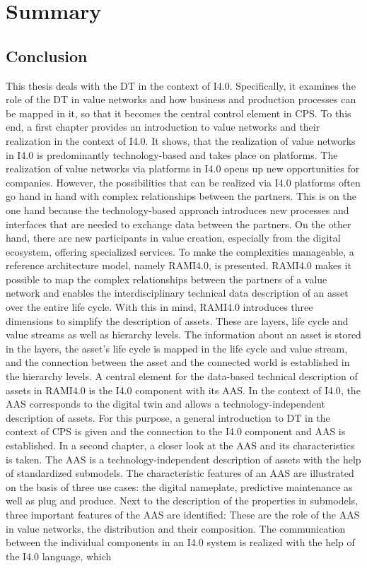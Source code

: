\chapter{Summary} \label{chap:summary}

\section{Conclusion}
This thesis deals with the \ac{DT} in the context of \ac{I4.0}. Specifically, it examines the role of the \ac{DT} in value networks and how business and production processes can be mapped in it, so that it becomes the central control element in \ac{CPS}. To this end, a first chapter provides an introduction to value networks and their realization in the context of \ac{I4.0}. It shows, that the realization of value networks in \ac{I4.0} is predominantly technology-based and takes place on platforms. The realization of value networks via platforms in \ac{I4.0} opens up new opportunities for companies. However, the possibilities that can be realized via \ac{I4.0} platforms often go hand in hand with complex relationships between the partners. This is on the one hand because the technology-based approach introduces new processes and interfaces that are needed to exchange data between the partners. On the other hand, there are new participants in value creation, especially from the digital ecosystem, offering specialized services. To make the complexities manageable, a reference architecture model, namely \ac{RAMI4.0}, is presented. \ac{RAMI4.0} makes it possible to map the complex relationships between the partners of a value network and enables the interdisciplinary technical data description of an asset over the entire life cycle. With this in mind, \ac{RAMI4.0} introduces three dimensions to simplify the description of assets. These are layers, life cycle and value streams as well as hierarchy levels. The information about an asset is stored in the layers, the asset's life cycle is mapped in the life cycle and value stream, and the connection between the asset and the connected world is established in the hierarchy levels. A central element for the data-based technical description of assets in \ac{RAMI4.0} is the \ac{I4.0} component with its \ac{AAS}. In the context of \ac{I4.0}, the \ac{AAS} corresponds to the digital twin and allows a technology-independent description of assets. For this purpose, a general introduction to \ac{DT} in the context of \ac{CPS} is given and the connection to the \ac{I4.0} component and \ac{AAS} is established.  In a second chapter, a closer look at the \ac{AAS} and its characteristics is taken. The \ac{AAS} is a technology-independent description of assets with the help of standardized submodels. The characteristic features of an \ac{AAS} are illustrated on the basis of three use cases: the digital nameplate, predictive maintenance as well as plug and produce. Next to the description of the properties in submodels, three important features of the \ac{AAS} are identified: These are the role of the \ac{AAS} in value networks, the distribution and their composition. The communication between the individual components in an \ac{I4.0} system is realized with the help of the \ac{I4.0} language, which 